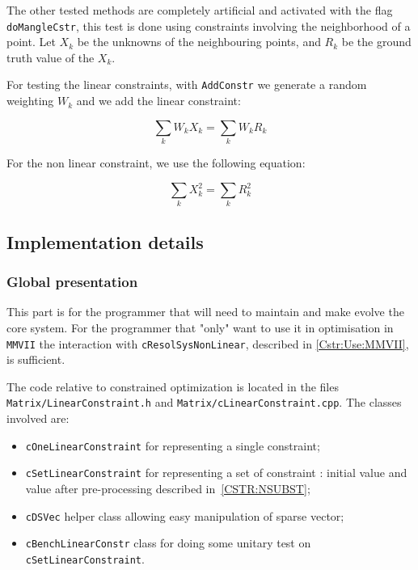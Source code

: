 The other tested methods are completely artificial and activated with the flag {\tt doMangleCstr},
this test is done using constraints involving the neighborhood of a point.
Let $X_k$ be the unknowns of the neighbouring points, and $R_k$  be the 
ground truth value of the $X_k$.

For testing the linear constraints, with {\tt AddConstr} we generate a random weighting $W_k$
and we add the linear constraint:

\begin{equation}
    \sum_k W_k  X_k = \sum_k  W_k  R_k  
\end{equation}

For the non linear constraint, we use the following equation:

\begin{equation}
    \sum_k  X_k^2 = \sum_k   R_k^2
\end{equation}


\subsection{Implementation details}


\subsubsection{Global presentation }

This part is for the programmer that will need to maintain and make evolve the core system.
For the programmer that "only" want to use it in optimisation in {\tt MMVII}
the interaction with {\tt cResolSysNonLinear}, described 
in \ref{Cstr:Use:MMVII}, is sufficient.

The code relative to constrained optimization is located in the files {\tt Matrix/LinearConstraint.h}
and  {\tt Matrix/cLinearConstraint.cpp}. The classes involved are:

\begin{itemize}
    \item  {\tt cOneLinearConstraint}  for representing a single constraint;
    \item  {\tt cSetLinearConstraint}  for representing a set of constraint  : initial value and value after
           pre-processing described in~\ref{CSTR:NSUBST};
    \item  {\tt cDSVec}   helper class allowing easy manipulation of sparse vector;
    \item  {\tt cBenchLinearConstr}   class for doing some unitary test on {\tt cSetLinearConstraint}.
\end{itemize}

